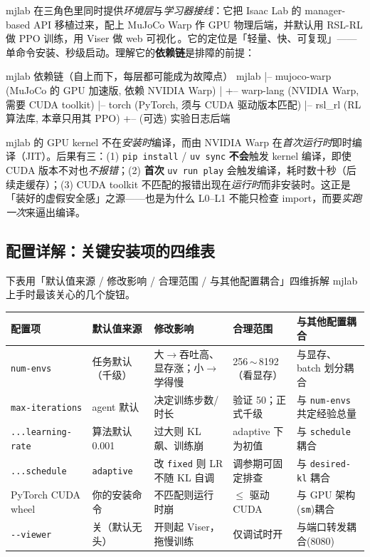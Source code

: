 mjlab 在三角色里同时提供\emph{环境层}与\emph{学习器接线}：它把 Isaac Lab 的 manager-based API 移植过来，配上 MuJoCo Warp 作 GPU 物理后端，并默认用 RSL-RL 做 PPO 训练，用 Viser 做 web 可视化\,\cite{mjlab2026}。它的定位是「轻量、快、可复现」——单命令安装、秒级启动。理解它的\textbf{依赖链}是排障的前提：

\begin{codebox}[text]{mjlab 依赖链（自上而下，每层都可能成为故障点）}
mjlab
  |-- mujoco-warp (MuJoCo 的 GPU 加速版, 依赖 NVIDIA Warp)
  |     +-- warp-lang (NVIDIA Warp, 需要 CUDA toolkit)
  |-- torch (PyTorch, 须与 CUDA 驱动版本匹配)
  |-- rsl_rl (RL 算法库, 本章只用其 PPO)
  +-- (可选) 实验日志后端
\end{codebox}

\begin{insight}\label{ins:rlmc-jit}
mjlab 的 GPU kernel 不在\emph{安装时}编译，而由 NVIDIA Warp 在\emph{首次运行时}即时编译（JIT）。后果有三：(1) \verb|pip install| / \verb|uv sync| \textbf{不会}触发 kernel 编译，即使 CUDA 版本不对也\emph{不报错}；(2) \textbf{首次} \verb|uv run play| 会触发编译，耗时数十秒（后续走缓存）；(3) CUDA toolkit 不匹配的报错出现在\emph{运行时}而非安装时。这正是「装好的虚假安全感」之源——也是为什么 L0--L1 不能只检查 import，而要\emph{实跑一次}来逼出编译。
\end{insight}

\subsection{配置详解：关键安装项的四维表}

下表用「默认值来源 / 修改影响 / 合理范围 / 与其他配置耦合」四维拆解 mjlab 上手时最该关心的几个旋钮。

\begin{center}
\small
\begin{tabular}{@{}p{2.4cm}p{2.4cm}p{3.0cm}p{2.6cm}p{2.6cm}@{}}
\toprule
配置项 & 默认值来源 & 修改影响 & 合理范围 & 与其他配置耦合 \\
\midrule
\verb|num-envs| & 任务默认（千级） & 大$\to$吞吐高、显存涨；小$\to$学得慢 & 256\,$\sim$\,8192（看显存） & 与显存、batch 划分耦合 \\
\verb|max-iterations| & agent 默认 & 决定训练步数/时长 & 验证 50；正式千级 & 与 \verb|num-envs| 共定经验总量 \\
\verb|...learning-rate| & 算法默认 0.001 & 过大则 KL 飙、训练崩 & adaptive 下为初值 & 与 \verb|schedule| 耦合 \\
\verb|...schedule| & \verb|adaptive| & 改 \verb|fixed| 则 LR 不随 KL 自调 & 调参期可固定排查 & 与 \verb|desired-kl| 耦合 \\
PyTorch CUDA wheel & 你的安装命令 & 不匹配则运行时崩 & $\le$ 驱动 CUDA & 与 GPU 架构(\texttt{sm})耦合 \\
\verb|--viewer| & 关（默认无头） & 开则起 Viser，拖慢训练 & 仅调试时开 & 与端口转发耦合(8080) \\
\bottomrule
\end{tabular}
\end{center}

